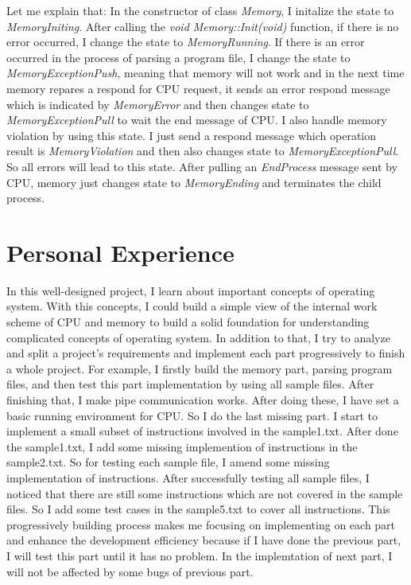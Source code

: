 \documentclass[a4paper]{report}
\begin{document}
Let me explain that: In the constructor of class \textit{\color{blue} Memory}, I initalize the state to \textit{\color{blue} MemoryIniting}. After calling the \textit{\color{blue} void Memory::Init(void)} function, if there is no error occurred, I change the state to \textit{\color{blue} MemoryRunning}. If there is an error occurred in the process of parsing a program file, I change the state to \textit{\color{blue} MemoryExceptionPush}, meaning that memory will not work and in the next time memory repares a respond for CPU request, it sends an error respond message which is indicated by \textit{\color{blue} MemoryError} and then changes state to \textit{\color{blue} MemoryExceptionPull} to wait the end message of CPU. I also handle memory violation by using this state. I just send a respond message which operation result is \textit{\color{blue} MemoryViolation} and then also changes state to \textit{\color{blue} MemoryExceptionPull}. So all errors will lead to this state. After pulling an \textit{\color{blue} EndProcess} message sent by CPU, memory just changes state to \textit{\color{blue} MemoryEnding} and terminates the child process.

\section*{Personal Experience}
In this well-designed project, I learn about important concepts of operating system. With this concepts, I could build a simple view of the internal work scheme of CPU and memory to build a solid foundation for understanding complicated concepts of operating system. In addition to that, I try to analyze and  split a project's requirements and implement each part progressively to finish a whole project. For example, I firstly build the memory part, parsing program files, and then test this part implementation by using all sample files. After finishing that, I make pipe communication works. After doing these, I have set a basic running environment for CPU. So I do the last missing part. I start to implement a small subset of instructions involved in the sample1.txt. After done the sample1.txt, I add some missing implemention of instructions in the sample2.txt. So for testing each sample file, I amend some missing implementation of instructions. After successfully testing all sample files, I noticed that there are still some instructions which are not covered in the sample files. So I add some test cases in the sample5.txt to cover all instructions. This progressively building process makes me focusing on implementing on each part and enhance the development efficiency because if I have done the previous part, I will test this part until it has no problem. In the implemtation of next part, I will not be affected by some bugs of previous part.
\end{document}
